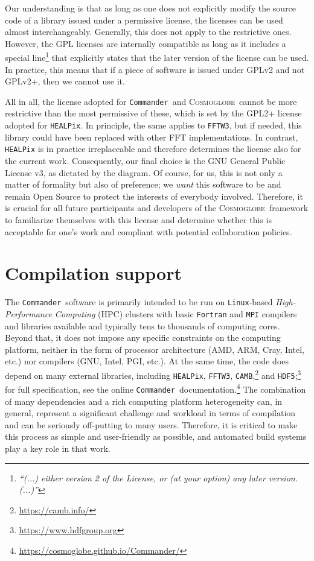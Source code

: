 \documentclass[twocolumn]{aa}
\def\commander{\texttt{Commander}}
\newcommand{\cosmoglobe}{\textsc{Cosmoglobe}}
\begin{document}
Our understanding is that as long as one does not explicitly modify the source code of a library issued under a permissive license, the licenses can be used almost interchangeably. Generally, this does not apply to the restrictive ones. However, the GPL licenses are internally compatible as long as it includes a special line\footnote{ \textit{``(...) either version 2 of the License, or (at your option) any later version. (...)''}}  that explicitly states that the later version of the license can be used. In practice, this means that if a piece of software is issued under GPLv2 and not GPLv2+, then we cannot use it.  

All in all, the license adopted for \commander\ and \cosmoglobe\ cannot be more restrictive than the most permissive of these, which is set by the GPL2+ license adopted for \texttt{HEALPix}. In principle, the same applies to \texttt{FFTW3}, but if needed, this library could have been replaced with other FFT implementations. In contrast, \texttt{HEALPix} is in practice irreplaceable and therefore determines the license also for the current work. Consequently, our final choice is the GNU General Public License v3, as dictated by the diagram. Of course, for us, this is not only a matter of formality but also of preference; we \emph{want} this software to be and remain Open Source to protect the interests of everybody involved. Therefore, it is crucial for all future participants and developers of the \cosmoglobe\ framework to familiarize themselves with this license and determine whether this is acceptable for one's work and compliant with potential collaboration policies.

\section{Compilation support}
\label{sec:compilation_support}

The \commander\ software is primarily intended to be run on \texttt{Linux}-based \textit{High-Performance Computing} (HPC) clusters with basic \texttt{Fortran} and \texttt{MPI} compilers and libraries available and typically tens to thousands of computing cores. Beyond that, it does not impose any specific constraints on the computing platform, neither in the form of processor architecture (AMD, ARM, Cray, Intel, etc.)  nor compilers (GNU, Intel, PGI, etc.). At the same time, the code does depend on many external libraries, including \texttt{HEALPix}, \texttt{FFTW3}, \texttt{CAMB},\footnote{\url{https://camb.info/}} and \texttt{HDF5};\footnote{\url{https://www.hdfgroup.org}} for full
specification, see the online \commander\ documentation.\footnote{\url{https://cosmoglobe.github.io/Commander/}} The combination of many dependencies and a rich computing platform heterogeneity can, in general, represent a significant challenge and workload in terms of compilation and can be seriously off-putting to many users. Therefore, it is critical to make this process as simple and user-friendly as possible, and automated build systems play a key role in that work.
\end{document}
